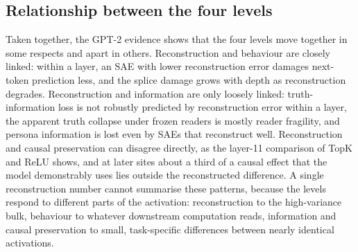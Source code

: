 \subsection{Relationship between the four levels}\label{sec:relationship}

Taken together, the GPT-2 evidence shows that the four levels move together in some respects and apart in others.
Reconstruction and behaviour are closely linked: within a layer, an SAE with lower reconstruction error damages
next-token prediction less, and the splice damage grows with depth as reconstruction degrades. Reconstruction and
information are only loosely linked: truth-information loss is not robustly predicted by reconstruction error within a
layer, the apparent truth collapse under frozen readers is mostly reader fragility, and persona information is lost
even by SAEs that reconstruct well. Reconstruction and causal preservation can disagree directly, as the layer-11
comparison of TopK and ReLU shows, and at later sites about a third of a causal effect that the model demonstrably uses
lies outside the reconstructed difference. A single reconstruction number cannot summarise these patterns, because
the levels respond to different parts of the activation: reconstruction to the high-variance bulk, behaviour to
whatever downstream computation reads, information and causal preservation to small, task-specific differences
between nearly identical activations.
